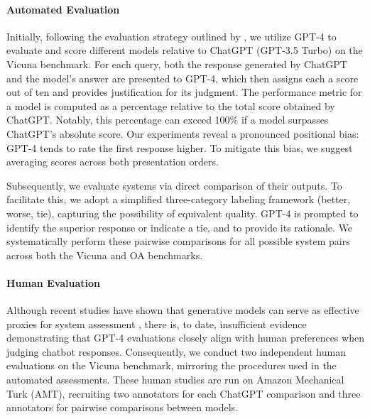 \paragraph{Automated Evaluation} Initially, following the evaluation strategy outlined by \citet{vicuna2023}, we utilize GPT-4 to evaluate and score different models relative to ChatGPT (GPT-3.5 Turbo) on the Vicuna benchmark. For each query, both the response generated by ChatGPT and the model’s answer are presented to GPT-4, which then assigns each a score out of ten and provides justification for its judgment. The performance metric for a model is computed as a percentage relative to the total score obtained by ChatGPT. Notably, this percentage can exceed 100\% if a model surpasses ChatGPT’s absolute score. Our experiments reveal a pronounced positional bias: GPT-4 tends to rate the first response higher. To mitigate this bias, we suggest averaging scores across both presentation orders.

Subsequently, we evaluate systems via direct comparison of their outputs. To facilitate this, we adopt a simplified three-category labeling framework (better, worse, tie), capturing the possibility of equivalent quality. GPT-4 is prompted to identify the superior response or indicate a tie, and to provide its rationale. We systematically perform these pairwise comparisons for all possible system pairs across both the Vicuna and OA benchmarks.

\paragraph{Human Evaluation} Although recent studies have shown that generative models can serve as effective proxies for system assessment \citep{fu2023gptscore}, there is, to date, insufficient evidence demonstrating that GPT-4 evaluations closely align with human preferences when judging chatbot responses. Consequently, we conduct two independent human evaluations on the Vicuna benchmark, mirroring the procedures used in the automated assessments. These human studies are run on Amazon Mechanical Turk (AMT), recruiting two annotators for each ChatGPT comparison and three annotators for pairwise comparisons between models.


